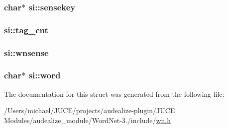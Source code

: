 \subsubsection[{\texorpdfstring{sensekey}{sensekey}}]{\setlength{\rightskip}{0pt plus 5cm}char$\ast$ si\+::sensekey}\hypertarget{structsi_a7d25bf9fa3d1e894b3ae00f566ae9ac3}{}\label{structsi_a7d25bf9fa3d1e894b3ae00f566ae9ac3}
\subsubsection[{\texorpdfstring{tag\+\_\+cnt}{tag_cnt}}]{ si\+::tag\+\_\+cnt}\hypertarget{structsi_a97565b93a0664af82de3e39367f4d858}{}\label{structsi_a97565b93a0664af82de3e39367f4d858}
\subsubsection[{\texorpdfstring{wnsense}{wnsense}}]{ si\+::wnsense}\hypertarget{structsi_af11b305927aaf7756d19b368c9773633}{}\label{structsi_af11b305927aaf7756d19b368c9773633}
\subsubsection[{\texorpdfstring{word}{word}}]{\setlength{\rightskip}{0pt plus 5cm}char$\ast$ si\+::word}\hypertarget{structsi_aa35a67e5e45bbaca9d67987fa30d2db7}{}\label{structsi_aa35a67e5e45bbaca9d67987fa30d2db7}


The documentation for this struct was generated from the following file\+:\begin{DoxyCompactItemize}
\item 
/\+Users/michael/\+J\+U\+C\+E/projects/audealize-\/plugin/\+J\+U\+C\+E Modules/audealize\+\_\+module/\+Word\+Net-\/3./include/\hyperlink{wn_8h}{wn.\+h}\end{DoxyCompactItemize}
